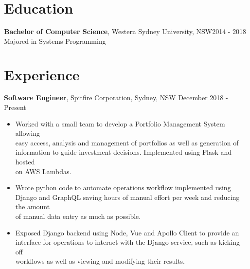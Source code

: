 \documentclass[margin]{res}
\begin{document}

\address{{\bf Present Address} \\ 26/23-25 John Street\\ Lidcombe, NSW 2141}
\address{{\bf Contact Details} \\ ben.hili1994@gmail.com \\ +61414329597}


\begin{resume}

\section{Education}
	{\bf Bachelor of Computer Science}, Western Sydney University, NSW\hfill 2014 - 2018\\
	Majored in Systems Programming

\section{Experience}
{\bf Software Engineer},
	Spitfire Corporation, Sydney, NSW \hfill December 2018 - Present
\begin{itemize} \itemsep 2pt  %

\item Worked with a small team to develop a Portfolio Management System allowing \\
	easy access, analysis and management of portfolios as well as generation of \\
		information to guide investment decisions. Implemented using Flask and hosted \\
		on AWS Lambdas.

\item Wrote python code to automate operations workflow implemented using \\
	Django and GraphQL saving hours of manual effort per week and reducing the amount \\
	of manual data entry as much as possible.

\item Exposed Django backend using Node, Vue and Apollo Client to provide an \\
	interface for operations to interact with the Django service, such as kicking off \\
	workflows as well as viewing and modifying their results.


\end{itemize}
\end{resume}
\end{document}
